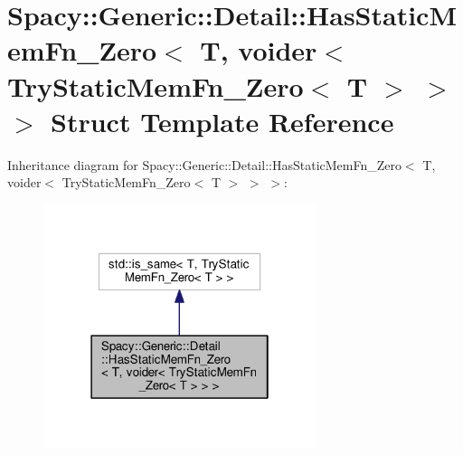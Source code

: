 \hypertarget{structSpacy_1_1Generic_1_1Detail_1_1HasStaticMemFn__Zero_3_01T_00_01voider_3_01TryStaticMemFn__Zero_3_01T_01_4_01_4_01_4}{\section{Spacy\-:\-:Generic\-:\-:Detail\-:\-:Has\-Static\-Mem\-Fn\-\_\-\-Zero$<$ T, voider$<$ Try\-Static\-Mem\-Fn\-\_\-\-Zero$<$ T $>$ $>$ $>$ Struct Template Reference}
\label{structSpacy_1_1Generic_1_1Detail_1_1HasStaticMemFn__Zero_3_01T_00_01voider_3_01TryStaticMemFn__Zero_3_01T_01_4_01_4_01_4}
}


Inheritance diagram for Spacy\-:\-:Generic\-:\-:Detail\-:\-:Has\-Static\-Mem\-Fn\-\_\-\-Zero$<$ T, voider$<$ Try\-Static\-Mem\-Fn\-\_\-\-Zero$<$ T $>$ $>$ $>$\-:
\nopagebreak
\begin{figure}[H]
\begin{center}
\leavevmode
\includegraphics[width=226pt]{structSpacy_1_1Generic_1_1Detail_1_1HasStaticMemFn__Zero_3_01T_00_01voider_3_01TryStaticMemFn__Z0ad7fa39e106caafe18e83e09fadac0b}
\end{center}
\end{figure}


